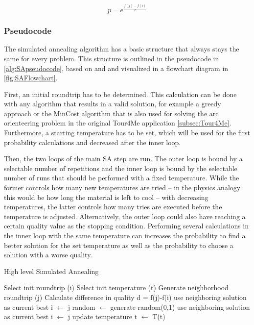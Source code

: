 \begin{equation}\label{eq:SAprobCalculation}
	p = e^{\frac{f(j)-f(i)}{T}}
\end{equation}



\subsubsection{Pseudocode}
\label{subsubsec:SAPseudocode}

The simulated annealing algorithm has a basic structure that always stays the same for every problem.
This structure is outlined in the pseudocode in \ref{alg:SApseudocode}, based on \cite{eglese_simulated_1990} and \cite{zhan_list-based_2016} and visualized in a flowchart diagram in \ref{fig:SAFlowchart}.

First, an initial roundtrip has to be determined. 
This calculation can be done with any algorithm that results in a valid solution, for example a greedy approach or the MinCost algorithm that is also used for solving the arc orienteering problem in the original Tour4Me application \ref{subsec:Tour4Me}.
Furthermore, a starting temperature has to be set, which will be used for the first probability calculations and decreased after the inner loop.

Then, the two loops of the main SA step are run.
The outer loop is bound by a selectable number of repetitions and the inner loop is bound by the selectable number of runs that should be performed with a fixed temperature.
While the former controls how many new temperatures are tried -- in the physics analogy this would be how long the material is left to cool -- with decreasing temperatures, the latter controls how many tries are executed before the temperature is adjusted. 
Alternatively, the outer loop could also have reaching a certain quality value as the stopping condition.
Performing several calculations in the inner loop with the same temperature can increases the probability to find a better solution for the set temperature as well as the probability to choose a solution with a worse quality.


\begin{breakablealgorithm}
	\caption{High level Simulated Annealing}
	\label{alg:SApseudocode}
	\begin{algorithmic}[1]
		\STATE Select init roundtrip (i)
		\STATE Select init temperature (t)
				\STATE Generate neighborhood roundtrip (j)
				\STATE Calculate difference in quality d = f(j)-f(i)
						\STATE use neighboring solution as current best i $\gets$ j
					\ELSE 
						\STATE random $\gets$ generate random(0,1)
							\STATE use neighboring solution as current best i $\gets$ j
						\ENDIF
					\ENDIF
			 \ENDFOR
			 \STATE update temperature t $\gets$ T(t)
		 \ENDFOR
	\end{algorithmic}
\end{breakablealgorithm}







